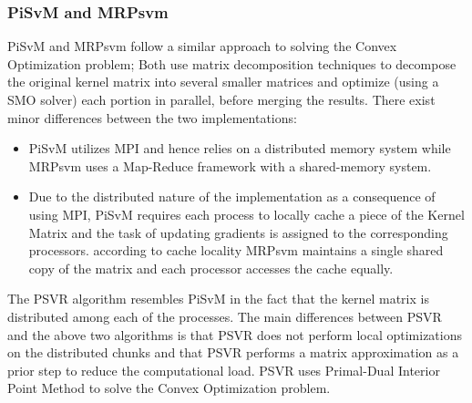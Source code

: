 \documentclass[12pt]{article}
\begin{document}
\subsubsection{PiSvM and MRPsvm}
\label{PiSvM and MRPsvm}
PiSvM and MRPsvm follow a similar approach to solving the Convex Optimization problem; Both use matrix decomposition techniques to decompose the original kernel matrix into several smaller matrices and optimize (using a SMO solver) each portion in parallel, before merging the results. There exist minor differences between the two implementations:
\begin{itemize}
\item PiSvM utilizes MPI and hence relies on a distributed memory system while MRPsvm uses a Map-Reduce framework with a shared-memory system.
\item Due to the distributed nature of the implementation as a consequence of using MPI, PiSvM requires each process to locally cache a piece of the Kernel Matrix and the task of updating gradients is assigned to the corresponding processors. according to cache locality MRPsvm maintains a single shared copy of the matrix and each processor accesses the cache equally.
\end{itemize}

The PSVR algorithm resembles PiSvM in the fact that the kernel matrix is distributed among each of the processes. The main differences between PSVR and the above two algorithms is that PSVR does not perform local optimizations on the distributed chunks and that PSVR performs a matrix approximation as a prior step to reduce the computational load. PSVR uses Primal-Dual Interior Point Method to solve the Convex Optimization problem.
\newline
\end{document}
